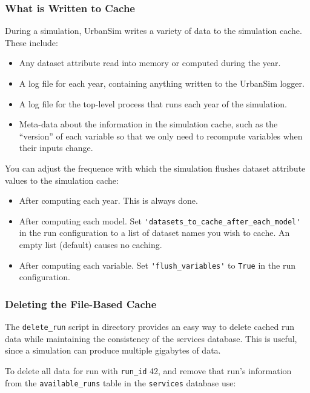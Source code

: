 \subsubsection{What is Written to Cache}
During a simulation, UrbanSim writes a variety of data to the simulation
cache. \simulationcacheindex These include:
\begin{itemize}
  \item Any dataset attribute read into memory or computed during the year.
  \item A log file for each year, containing anything written to the UrbanSim
  logger.
  \item A log file for the top-level process that runs each year of the
  simulation.
  \item Meta-data about the information in the simulation
  cache, \simulationcacheindex such as the ``version'' of each variable so that
  we only need to recompute variables when their inputs change.
\end{itemize}

You can adjust the frequence with which the simulation flushes dataset 
attribute values to the simulation cache: \simulationcacheindex

\begin{itemize}
  \item After computing each year.  This is always done.
  \item After computing each model.  Set
  \verb|'datasets_to_cache_after_each_model'| in the run configuration to
  a list of dataset names you wish to cache. An empty list (default) causes
  no caching.
  \item After computing each variable. Set \verb|'flush_variables'| to \verb|True| in the
  run configuration.
\end{itemize}

\subsubsection{Deleting the File-Based Cache}

The \verb|delete_run| script in  directory
provides an easy way to delete cached run data while maintaining the
consistency of the services database.  This is useful, since a simulation can
produce multiple gigabytes of data.

To delete all data for run with \verb|run_id| 42, and remove that run's
information from the \verb|available_runs| table in the \verb|services|
database use:

